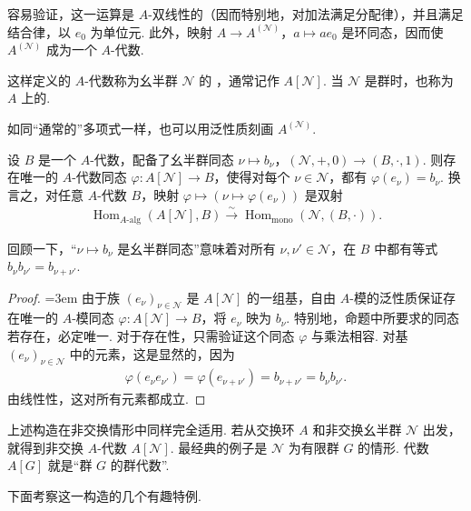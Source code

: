容易验证，这一运算是 $A$-双线性的（因而特别地，对加法满足分配律），并且满足结合律，以 $e_0$ 为单位元. 此外，映射 $A\longrightarrow A^{(\mathcal N)}$，$a\longmapsto ae_0$ 是环同态，因而使 $A^{(\mathcal N)}$ 成为一个 $A$-代数.
\begin{definition*}
这样定义的 $A$-代数称为幺半群 $\mathcal N$ 的 ，通常记作 $A[\mathcal N]$. 当 $\mathcal N$ 是群时，也称为 $A$ 上的.
\end{definition*}
如同``通常的''多项式一样，也可以用泛性质刻画 $A^{(\mathcal N)}$.
\begin{proposition*}
设 $B$ 是一个 $A$-代数，配备了幺半群同态 $\nu\longmapsto b_\nu$，$(\mathcal N,+,0)\longrightarrow(B,\cdot,1)$. 则存在唯一的 $A$-代数同态 $\varphi\colon A[\mathcal N]\longrightarrow B$，使得对每个 $\nu\in\mathcal N$，都有 $\varphi(e_\nu)=b_\nu$. 换言之，对任意 $A$-代数 $B$，映射 $\varphi\longmapsto(\nu\longmapsto\varphi(e_\nu))$ 是双射
\begin{align*}
\operatorname{Hom}_{A\text{-}\mathrm{alg}}(A[\mathcal N],B)
\xrightarrow{\sim}\operatorname{Hom}_{\mathrm{mono}}(\mathcal N,(B,\cdot)).
\end{align*}
\end{proposition*}
回顾一下，``$\nu\longmapsto b_\nu$ 是幺半群同态''意味着对所有 $\nu,\nu'\in\mathcal N$，在 $B$ 中都有等式 $b_\nu b_{\nu'}=b_{\nu+\nu'}$.
\begin{proof}
\emergencystretch=3em
由于族 $(e_\nu)_{\nu\in\mathcal N}$ 是 $A[\mathcal N]$ 的一组基，自由 $A$-模的泛性质保证存在唯一的 $A$-模同态 $\varphi\colon A[\mathcal N]\longrightarrow B$，将 $e_\nu$ 映为 $b_\nu$. 特别地，命题中所要求的同态若存在，必定唯一. 对于存在性，只需验证这个同态 $\varphi$ 与乘法相容. 对基 $(e_\nu)_{\nu\in\mathcal N}$ 中的元素，这是显然的，因为
\begin{align*}
\varphi(e_\nu e_{\nu'})=\varphi(e_{\nu+\nu'})=b_{\nu+\nu'}=b_\nu b_{\nu'}.
\end{align*}
由线性性，这对所有元素都成立.
\end{proof}
\begin{remark*}
上述构造在非交换情形中同样完全适用. 若从交换环 $A$ 和非交换幺半群 $\mathcal N$ 出发，就得到非交换 $A$-代数 $A[\mathcal N]$. 最经典的例子是 $\mathcal N$ 为有限群 $G$ 的情形. 代数 $A[G]$ 就是``群 $G$ 的群代数''.
\end{remark*}
下面考察这一构造的几个有趣特例.

